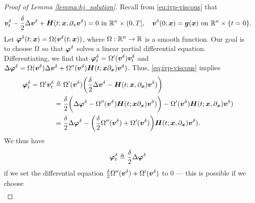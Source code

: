 \begin{proof}[Proof of Lemma \ref{lemma:hj_solution}]
	Recall from \eqref{eq:ivp-viscous} that 
	\begin{align}
		\bm{v}_t^\delta -\dfrac{\delta}{2} \Delta \bm{v}^\delta  + \bm{H}(t; \bm{x}, \partial_x \bm{v}^\delta) = 0\text{   in   } \mathbb{R}^n \times (0, T], \quad
		\bm{v}^\delta(0; \bm{x}) = \bm{g}(\bm{x}) \text{ on } \mathbb{R}^n \times \{t=0\}.
	\end{align}
%
Let $\bm{\varphi}^\delta(t; \bm{x}) = \Omega(\bm{v}^\delta(t; \bm{x}))$, where $\Omega: \mathbb{R}^n \rightarrow \mathbb{R}$ is a smooth function. Our goal is to choose $\Omega$ so that $\bm{\varphi}^\delta$ solves a linear partial differential equation. Differentiating, we find that $\bm{\varphi}^\delta_t = \Omega^\prime(\bm{v}^\delta) \bm{v}^\delta_t$ and $\Delta \bm{\varphi}^\delta = \Omega(\bm{v}^\delta) \Delta \bm{v}^\delta + \Omega^{\prime\prime}(\bm{v}^\delta) \bm{H}(t; \bm{x} \partial_{\bm{x}}) \bm{v}^\delta)$. Thus, \eqref{eq:ivp-viscous} implies 
%
\begin{subequations}
\begin{align}
\colehopf^\delta_t = \openset^\prime \valuefunc_t^\delta &\triangleq \openset^\prime (\valuefunc^\delta) \bigg(\frac{\delta}{2} \Delta \valuefunc^\delta - \hamfunc(t; \state, \partial_{\state})\valuefunc^\delta)\bigg) \\
			&= \frac{\delta}{2} \bigg(\Delta \colehopf^\delta - \openset^{\prime\prime}(\valuefunc^\delta) \hamfunc(t; \state \partial_{\state}) \valuefunc^\delta) \bigg) - \openset^\prime(\valuefunc^\delta)  \hamfunc(t; \state, \partial_{\state})\valuefunc^\delta) \\
			&= \frac{\delta}{2} \Delta \colehopf^\delta - \bigg(\frac{\delta}{2} \openset^{\prime\prime}(\valuefunc^\delta) + \openset^\prime(\valuefunc^\delta) \bigg)   \hamfunc(t; \state, \partial_{\state})\valuefunc^\delta).  %
\end{align}
\end{subequations}
%
We thus have 
%
\begin{align}
	\bm{\varphi}^\delta_t \triangleq \frac{\delta}{2} \Delta \bm{\varphi}^\delta
	\label{eq:cole-hopf-time-deriv}
\end{align}
%
 if we set the differential equation $\frac{\delta}{2} \Omega^{\prime\prime}(\bm{v}^\delta) + \Omega^\prime(\bm{v}^\delta)$ to $0$ --- this is possible if we choose 
 \begin{align}

\end{align}
\end{proof}
